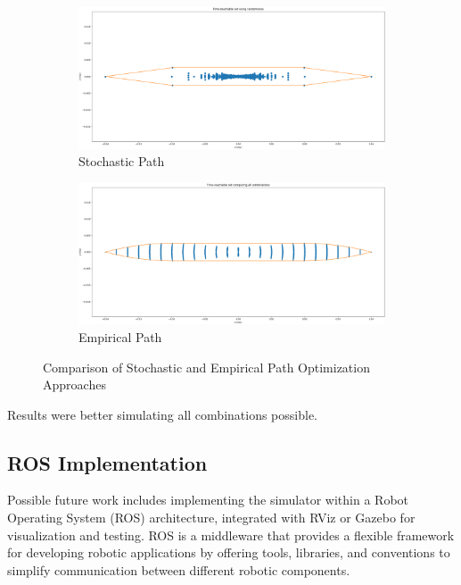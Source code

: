 \documentclass[../main.tex]{subfiles}
\begin{document}
\begin{figure}[H]
	\centering
	\begin{subfigure}[b]{0.45\textwidth}
		\includegraphics[width=\textwidth]{IMAGES/perspectives/random.png}
		\caption{Stochastic Path}
		\label{fig:stocha_path}
	\end{subfigure}
	\hfill
	\begin{subfigure}[b]{0.45\textwidth}
		\includegraphics[width=\textwidth]{IMAGES/perspectives/empiric.png}
		\caption{Empirical Path}
		\label{fig:empir_path}
	\end{subfigure}
	\caption{Comparison of Stochastic and Empirical Path Optimization Approaches}
	\label{fig:path_optimization}
\end{figure}

Results were better simulating all combinations possible.

\subsection*{ROS Implementation}
Possible future work includes implementing the simulator within a Robot Operating System (ROS) architecture, integrated with RViz or Gazebo for visualization and testing. ROS is a middleware that provides a flexible framework for developing robotic applications by offering tools, libraries, and conventions to simplify communication between different robotic components. 
\end{document}
